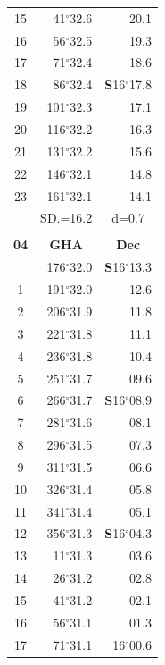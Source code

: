 \documentclass[10pt, a4paper]{report}
\begin{document}
\begin{scriptsize}
\begin{tabular*}{0.2\textwidth}[t]{@{\extracolsep{\fill}}|c|rr|}
15 & 41$^\circ$32.6 & \raisebox{0.24ex}{\boldmath$\cdot$~\boldmath$\cdot$~~}20.1\\
16 & 56$^\circ$32.5 & 19.3\\
17 & 71$^\circ$32.4 & 18.6\\[2Pt]
18 & 86$^\circ$32.4 & \textbf{S}16$^\circ$17.8\\
19 & 101$^\circ$32.3 & 17.1\\
20 & 116$^\circ$32.2 & 16.3\\
21 & 131$^\circ$32.2 & \raisebox{0.24ex}{\boldmath$\cdot$~\boldmath$\cdot$~~}15.6\\
22 & 146$^\circ$32.1 & 14.8\\
23 & 161$^\circ$32.1 & 14.1\\
\hline
\rule{0pt}{2.4ex} & \multicolumn{1}{c}{SD.=16.2} & \multicolumn{1}{c|}{d=0.7}\\
\hline
\multicolumn{1}{c}{}\\[-0.5ex]\hline
\multicolumn{1}{|c|}{\rule{0pt}{2.6ex}\textbf{04}} & \multicolumn{1}{c}{\textbf{GHA}} & \multicolumn{1}{c|}{\textbf{Dec}}\\
\hline\rule{0pt}{2.6ex}\noindent
0 & 176$^\circ$32.0 & \textbf{S}16$^\circ$13.3\\
1 & 191$^\circ$32.0 & 12.6\\
2 & 206$^\circ$31.9 & 11.8\\
3 & 221$^\circ$31.8 & \raisebox{0.24ex}{\boldmath$\cdot$~\boldmath$\cdot$~~}11.1\\
4 & 236$^\circ$31.8 & 10.4\\
5 & 251$^\circ$31.7 & 09.6\\[2Pt]
6 & 266$^\circ$31.7 & \textbf{S}16$^\circ$08.9\\
7 & 281$^\circ$31.6 & 08.1\\
8 & 296$^\circ$31.5 & 07.3\\
9 & 311$^\circ$31.5 & \raisebox{0.24ex}{\boldmath$\cdot$~\boldmath$\cdot$~~}06.6\\
10 & 326$^\circ$31.4 & 05.8\\
11 & 341$^\circ$31.4 & 05.1\\[2Pt]
12 & 356$^\circ$31.3 & \textbf{S}16$^\circ$04.3\\
13 & 11$^\circ$31.3 & 03.6\\
14 & 26$^\circ$31.2 & 02.8\\
15 & 41$^\circ$31.2 & \raisebox{0.24ex}{\boldmath$\cdot$~\boldmath$\cdot$~~}02.1\\
16 & 56$^\circ$31.1 & 01.3\\
17 & 71$^\circ$31.1 & 16$^\circ$00.6\\[2Pt]

\end{tabular*}
\end{scriptsize}
\end{document}
